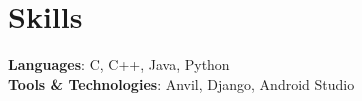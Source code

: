 \documentclass[letterpaper,11pt]{article}
\newcommand{\resumeSubHeadingListStart}{\begin{itemize}[leftmargin=0.0in, label={}]}
\newcommand{\resumeSubHeadingListEnd}{\end{itemize}}
\begin{document}





\section{Skills}
 \begin{itemize}[leftmargin=0.15in, label={}]
    \small{\item{
     \textbf{Languages}{: C, C++, Java, Python } \\
     \textbf{Tools \& Technologies}{: Anvil, Django, Android Studio } \\
    }}
 \end{itemize}
 \vspace{-10pt}
\end{document}
